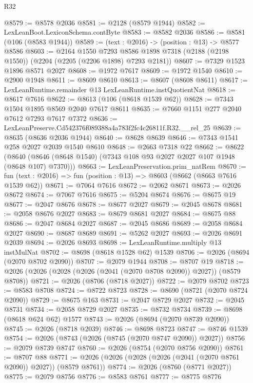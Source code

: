 \begin{lexlean}{R32}
\begin{coremodule}
@8579 := @8578 @2036
@8581 := @2128 (@8579 @1944)
@8582 := LexLeanBoot.LexiconSchema.contByte
@8583 := @8582 @2036
@8586 := @8581 (@106 (@8583 @1944))
@8589 := (text : @2016) -> (position : @13) -> @8577 @8586
@8603 := @2164
    @1550
    @7293
    @8586
    @1898
    @7318
    (@2188 (@2198 @1550))
    (@2204 (@2205 (@2206 @1898) @7293 @2181))
@8607 := @7329 @1523 @1896 @8571 @2027
@8608 := @1972 @7617
@8609 := @1972 @1540
@8610 := @2900 @1948
@8611 := @8609 @8610
@8613 := @8607 (@8608 @8611)
@8617 := LexLeanRuntime.remainder @13 LexLeanRuntime.instQuotientNat
@8618 := @8617 @7616
@8622 := @8613 (@106 (@8618 @1539 @62))
@8628 := @7343 @1504 @1895 @8569 @2040 @7617 @8611
@8635 := @7660 @1151 @277 @2040 @7612 @7293 @7617 @7372
@8636 := LexLeanPreserve.Cd542376f089388a4a783f2fc4c26811f.R32.__rel_25
@8639 := @8635 (@8636 @2036 @1944)
@8640 := @8628 @8639
@8646 := @7343 @1541 @258 @2027 @2039 @1540 @8610
@8648 := @2663 @7318 @22
@8662 := @8622
    (@8640 (@8646 (@8648 @1540) (@7343 @108 @93 @2027 @2027 @107 @1948 (@8648 @107) @7370)))
@8663 := LexLeanPreservation.prim_natRem
@8670 := fun (text : @2016) => fun (position : @13) => @8603 (@8662 (@8663 @7616 @1539 @62))
@8671 := @7064 @7616
@8672 := @2062 @8671
@8673 := @2026 @8672
@8674 := @7067 @7616
@8675 := @5204 @8674
@8676 := @8675 @19
@8677 := @2047 @8676
@8678 := @8677 @2027
@8679 := @2045 @8678
@8681 := @2058 @8676 @2027
@8683 := @8679 @8681 @2027
@8684 := @8675 @88
@8686 := @2047 @8684 @2027
@8687 := @2045 @8686
@8689 := @2058 @8684 @2027
@8690 := @8687 @8689
@8691 := @5262 @2027
@8693 := @2026 @8691 @2039
@8694 := @2026 @8693
@8698 := LexLeanRuntime.multiply @13 instMulNat
@8702 := @8698 (@8618 @1528 @62) @1539
@8706 := @2026 (@8694 (@2070 @8702 @2090))
@8707 := @2079 @1944
@8708 := @8707 @19
@8718 := @2026 (@2026 (@2028 (@2026 (@2041 (@2070 @8708 @2090)) @2027)) (@8579 @8708))
@8721 := @2026 (@8706 (@8718 @2027))
@8722 := @2079 @8702
@8723 := @8583 @8708
@8724 := @8722 @8723
@8728 := @8690 (@8721 (@2070 @8724 @2090))
@8729 := @8675 @163
@8731 := @2047 @8729 @2027
@8732 := @2045 @8731
@8734 := @2058 @8729 @2027
@8735 := @8732 @8734
@8739 := @8698 (@8618 @624 @62) @1577
@8743 := @2026 (@8694 (@2070 @8739 @2090))
@8745 := @2026 (@8718 @2039)
@8746 := @8698 @8723
@8747 := @8746 @1539
@8754 := @2026 (@8743 (@2026 (@8745 (@2070 @8747 @2090)) @2027))
@8756 := @2079 @8739 @8747
@8760 := @2026 (@8754 (@2070 @8756 @2090))
@8761 := @8707 @88
@8771 := @2026 (@2026 (@2028 (@2026 (@2041 (@2070 @8761 @2090)) @2027)) (@8579 @8761))
@8774 := @2026 (@8760 (@8771 @2027))
@8775 := @2079 @8756
@8776 := @8583 @8761
@8777 := @8775 @8776

\end{coremodule}
\end{lexlean}
